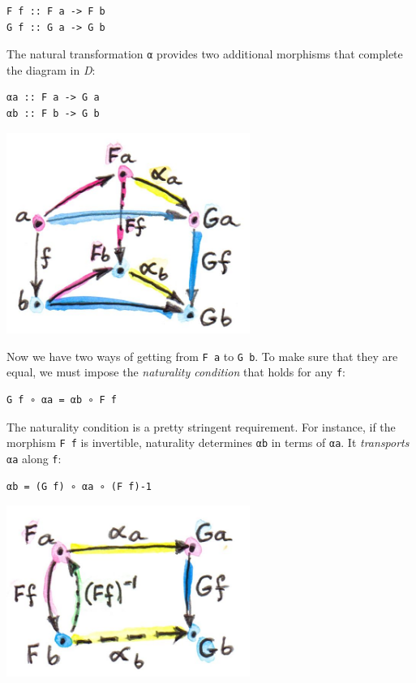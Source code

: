 \begin{verbatim}
F f :: F a -> F b
G f :: G a -> G b
\end{verbatim}

The natural transformation \texttt{α} provides two additional morphisms
that complete the diagram in \emph{D}:

\begin{verbatim}
αa :: F a -> G a
αb :: F b -> G b
\end{verbatim}

\includegraphics[width=3.12500in]{images/3_naturality.jpg}

Now we have two ways of getting from \texttt{F\ a} to \texttt{G\ b}. To
make sure that they are equal, we must impose the \emph{naturality
condition} that holds for any \texttt{f}:

\begin{verbatim}
G f ∘ αa = αb ∘ F f
\end{verbatim}

The naturality condition is a pretty stringent requirement. For
instance, if the morphism \texttt{F\ f} is invertible, naturality
determines \texttt{αb} in terms of \texttt{αa}. It \emph{transports}
\texttt{αa} along \texttt{f}:

\begin{verbatim}
αb = (G f) ∘ αa ∘ (F f)-1
\end{verbatim}

\includegraphics[width=3.12500in]{images/4_transport.jpg}

